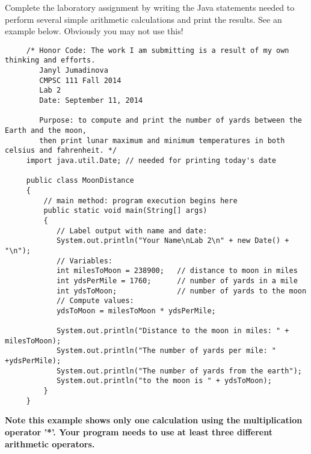  Complete the laboratory assignment by writing the Java statements needed to perform several simple
arithmetic calculations and print the results. See an example below. Obviously you may not use this!

\begin{verbatim}
     /* Honor Code: The work I am submitting is a result of my own thinking and efforts.
        Janyl Jumadinova
        CMPSC 111 Fall 2014
        Lab 2
        Date: September 11, 2014
     
        Purpose: to compute and print the number of yards between the Earth and the moon, 
        then print lunar maximum and minimum temperatures in both celsius and fahrenheit. */
     import java.util.Date; // needed for printing today's date
     
     public class MoonDistance
     {
         // main method: program execution begins here
         public static void main(String[] args)
         {
            // Label output with name and date:
            System.out.println("Your Name\nLab 2\n" + new Date() + "\n");     
            // Variables:
            int milesToMoon = 238900;   // distance to moon in miles
            int ydsPerMile = 1760;      // number of yards in a mile
            int ydsToMoon;              // number of yards to the moon           
            // Compute values:
            ydsToMoon = milesToMoon * ydsPerMile;
            
            System.out.println("Distance to the moon in miles: " + milesToMoon);
            System.out.println("The number of yards per mile: " +ydsPerMile);
            System.out.println("The number of yards from the earth");
            System.out.println("to the moon is " + ydsToMoon);
         }
     }
\end{verbatim}

\noindent \textbf{Note this example shows only one calculation using the multiplication operator '*'. Your program needs to use at least three different arithmetic operators. }

